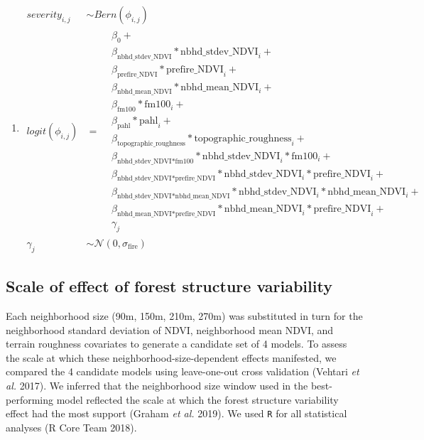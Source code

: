 \documentclass[]{article}
\providecommand{\tightlist}{%
  \setlength{\itemsep}{0pt}\setlength{\parskip}{0pt}}
\begin{document}
\begin{enumerate}
\def\labelenumi{(\arabic{enumi})}
\setcounter{enumi}{1}
\tightlist
\item
  \(\begin{aligned} \label{eq-severity-model} severity_{i, j} &\sim Bern(\phi_{i,j}) \\ logit(\phi_{i,j}) &= \begin{aligned} & \beta_0 + \\ & \beta_{\text{nbhd\_stdev\_NDVI}} * \text{nbhd\_stdev\_NDVI}_i + \\ & \beta_{\text{prefire\_NDVI}} * \text{prefire\_NDVI}_i + \\ & \beta_{\text{nbhd\_mean\_NDVI}} * \text{nbhd\_mean\_NDVI}_i + \\ & \beta_{\text{fm100}} * \text{fm100}_i + \\ & \beta_{\text{pahl}} * \text{pahl}_i + \\ & \beta_{\text{topographic\_roughness}} * \text{topographic\_roughness}_i + \\ & \beta_{\text{nbhd\_stdev\_NDVI*fm100}} * \text{nbhd\_stdev\_NDVI}_i * \text{fm100}_i + \\ & \beta_{\text{nbhd\_stdev\_NDVI*prefire\_NDVI}} * \text{nbhd\_stdev\_NDVI}_i * \text{prefire\_NDVI}_i + \\ & \beta_{\text{nbhd\_stdev\_NDVI*nbhd\_mean\_NDVI}} * \text{nbhd\_stdev\_NDVI}_i * \text{nbhd\_mean\_NDVI}_i + \\ & \beta_{\text{nbhd\_mean\_NDVI*prefire\_NDVI}} * \text{nbhd\_mean\_NDVI}_i * \text{prefire\_NDVI}_i + \\ & \gamma_j \end{aligned} \\ \gamma_j &\sim \mathcal{N}(0, \sigma_{\text{fire}}) \end{aligned}\)
\end{enumerate}

\hypertarget{scale-of-effect-of-forest-structure-variability}{%
\subsection{Scale of effect of forest structure
variability}\label{scale-of-effect-of-forest-structure-variability}}

Each neighborhood size (90m, 150m, 210m, 270m) was substituted in turn
for the neighborhood standard deviation of NDVI, neighborhood mean NDVI,
and terrain roughness covariates to generate a candidate set of 4
models. To assess the scale at which these neighborhood-size-dependent
effects manifested, we compared the 4 candidate models using
leave-one-out cross validation (Vehtari \emph{et al.} 2017). We inferred
that the neighborhood size window used in the best-performing model
reflected the scale at which the forest structure variability effect had
the most support (Graham \emph{et al.} 2019). We used \texttt{R} for all
statistical analyses (R Core Team 2018).
\end{document}
